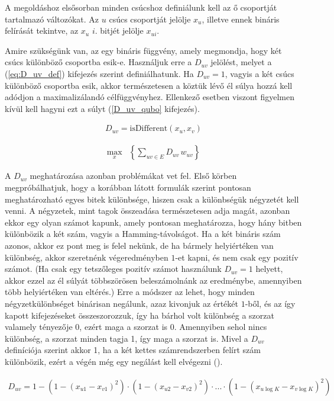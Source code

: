 A megoldáshoz elsősorban minden csúcshoz definiálunk kell az ő csoportját tartalmazó változókat. Az $u$ csúcs csoportját jelölje $x_u$, illetve ennek bináris felírását tekintve, az $x_u$ $i.$ bitjét jelölje $x_{ui}$.

Amire szükségünk van, az egy bináris függvény, amely megmondja, hogy két csúcs különböző csoportba esik-e. Használjuk erre a $D_{uv}$ jelölést, melyet a (\ref{eq:D_uv_def}) kifejezés szerint definiálhatunk. Ha $D_{uv}=1$, vagyis a két csúcs különböző csoportba esik, akkor természetesen a köztük lévő él súlya hozzá kell adódjon a maximalizálandó célfüggvényhez. Ellenkező esetben viszont figyelmen kívül kell hagyni ezt a súlyt (\ref{D_uv_qubo} kifejezés).

\begin{align}\label{eq:D_uv_def}
D_{uv} = \text{isDifferent}(x_u,x_v)
\end{align}

\begin{align} \label{D_uv_qubo}
	\max_{x} & \left\{\sum _{uv \in E } D_{uv} \, w_{uv} \right\} 
\end{align}

A $D_{uv}$ meghatározása azonban problémákat vet fel. Első körben megpróbálhatjuk, hogy a korábban látott formulák szerint pontosan meghatározható egyes bitek különbsége, hiszen csak a különbségük négyzetét kell venni. A négyzetek, mint tagok összeadása természetesen adja magát, azonban ekkor egy olyan számot kapunk, amely pontosan meghatározza, hogy hány bitben különbözik a két szám, vagyis a Hamming-távolságot. Ha a két bináris szám azonos, akkor ez pont meg is felel nekünk, de ha bármely helyiértéken van különbség, akkor szeretnénk végeredményben $1$-et kapni, és nem csak egy pozitív számot. (Ha csak egy tetszőleges pozitív számot használunk $D_{uv}=1$ helyett, akkor ezzel az él súlyát többszörösen beleszámolnánk az eredménybe, amennyiben több helyiértéken van eltérés.) Erre a módszer az lehet, hogy minden négyzetkülönbséget binárisan negálunk, azaz kivonjuk az értékét $1$-ből, és az így kapott kifejezéseket összeszorozzuk, így ha bárhol volt különbség a szorzat valamely tényezője 0, ezért maga a szorzat is 0. Amennyiben sehol nincs különbség, a szorzat minden tagja 1, így maga a szorzat is. Mivel a $D_{uv}$ definíciója szerint akkor 1, ha a két kettes számrendszerben felírt szám különbözik, ezért a végén még egy negálást kell elvégezni ().

\begin{align}\label{eq:D_uv_poli}
	D_{uv} = 1-  \left( 1-(x_{u1}-x_{v1})^2 \right) \cdot \left( 1-(x_{u2}-x_{v2})^2 \right) \cdot ...  \cdot \left( 1-(x_{u\log K}-x_{v \log K})^2 \right) 
\end{align}


